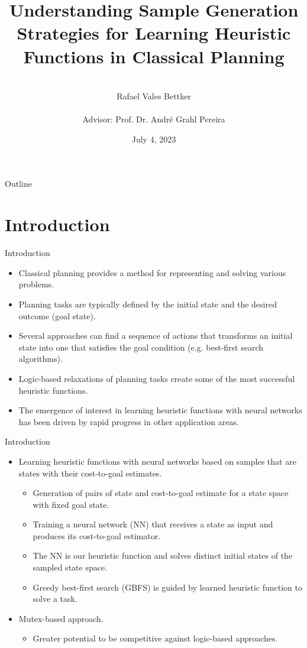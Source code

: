 \documentclass{gkibeamer}
\title{Understanding Sample Generation Strategies for Learning Heuristic Functions in Classical Planning}
\author{
    \\Rafael Vales Bettker
    \\[.2\baselineskip]
    \\Advisor: Prof. Dr. André Grahl Pereira
}
\institute{Federal University of Rio Grande do Sul\\Institute of Informatics\\Department of Theoretical Informatics}
\date{July 4, 2023}
\begin{document}
\begin{frame}{Outline}
\tableofcontents
\end{frame}

\section{Introduction}

\begin{frame}{Introduction}
\begin{itemize}
    \item Classical planning provides a method for representing and solving various problems.
    \pause
    \item Planning tasks are typically defined by the initial state and the desired outcome (goal state).
    \pause
    \item Several approaches can find a sequence of actions that transforms an initial state into one that satisfies the goal condition (e.g. best-first search algorithms).
    \pause
    \item Logic-based relaxations of planning tasks create some of the most successful heuristic functions.
    \pause
    \item The emergence of interest in learning heuristic functions with neural networks has been driven by rapid progress in other application areas.
\end{itemize}
\end{frame}

\begin{frame}{Introduction}
\begin{itemize}
    \item Learning heuristic functions with neural networks based on samples that are states with their cost-to-goal estimates.
    \begin{itemize}
        \pause
        \item Generation of pairs of state and cost-to-goal estimate for a state space with fixed goal state.
        \pause
        \item Training a neural network (NN) that receives a state as input and produces its cost-to-goal estimator.
        \pause
        \item The NN is our \alert{heuristic function} and solves distinct initial states of the sampled state space.
        \pause
        \item Greedy best-first search (GBFS) is guided by learned heuristic function to solve a task.
    \end{itemize}
    \item Mutex-based approach.
    \begin{itemize}
        \item Greater potential to be competitive against logic-based approaches.
    \end{itemize}
\end{itemize}
\end{frame}
\end{document}

